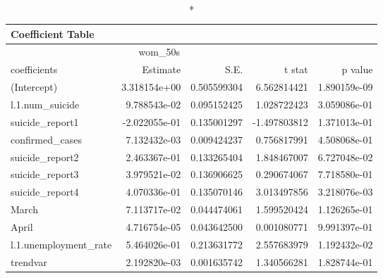 \begin{longtable}{lrrrr}
\caption*{
{\large Coefficient Table}
} \\ 
\toprule
\multicolumn{4}{c}{wom\_50s} &  \\ 
\cmidrule(lr){1-4}
coefficients & Estimate & S.E. & t stat & p value \\ 
\midrule\addlinespace[2.5pt]
(Intercept) & 3.318154e+00 & 0.505599304 & 6.562814421 & 1.890159e-09 \\ 
l.1.num\_suicide & 9.788543e-02 & 0.095152425 & 1.028722423 & 3.059086e-01 \\ 
suicide\_report1 & -2.022055e-01 & 0.135001297 & -1.497803812 & 1.371013e-01 \\ 
confirmed\_cases & 7.132432e-03 & 0.009424237 & 0.756817991 & 4.508068e-01 \\ 
suicide\_report2 & 2.463367e-01 & 0.133265404 & 1.848467007 & 6.727048e-02 \\ 
suicide\_report3 & 3.979521e-02 & 0.136906625 & 0.290674067 & 7.718580e-01 \\ 
suicide\_report4 & 4.070336e-01 & 0.135070146 & 3.013497856 & 3.218076e-03 \\ 
March & 7.113717e-02 & 0.044474061 & 1.599520424 & 1.126265e-01 \\ 
April & 4.716754e-05 & 0.043642500 & 0.001080771 & 9.991397e-01 \\ 
l.1.unemployment\_rate & 5.464026e-01 & 0.213631772 & 2.557683979 & 1.192432e-02 \\ 
trendvar & 2.192820e-03 & 0.001635742 & 1.340566281 & 1.828744e-01 \\ 
\bottomrule
\end{longtable}

